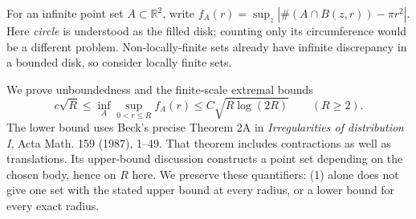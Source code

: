 For an infinite point set $A\subset\mathbb R^2$, write
$f_A(r)=\sup_z|\#(A\cap B(z,r))-\pi r^2|$.
Here \emph{circle} is understood as the filled disk; counting only its circumference would be a different problem. Non-locally-finite sets already have infinite discrepancy in a bounded disk, so consider locally finite sets.

We prove unboundedness and the finite-scale extremal bounds
\[
 c\sqrt R\le \inf_A\sup_{0<r\le R} f_A(r)
 \le C\sqrt{R\log(2R)}\qquad(R\ge2).
 \tag{1}
\]
The lower bound uses Beck's precise Theorem 2A in \emph{Irregularities of distribution I}, Acta Math. 159 (1987), 1--49. That theorem includes contractions as well as translations. Its upper-bound discussion constructs a point set depending on the chosen body, hence on $R$ here. We preserve these quantifiers: (1) alone does not give one set with the stated upper bound at every radius, or a lower bound for every exact radius.
